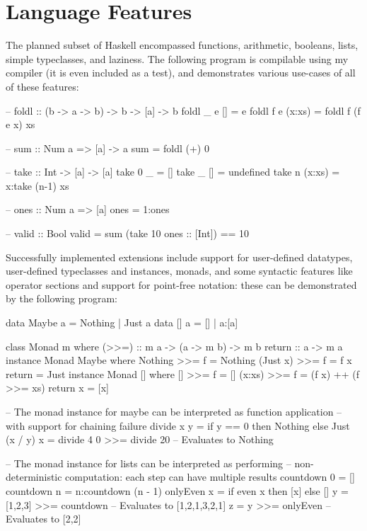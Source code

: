 \documentclass[dissertation.tex]{subfiles}
\begin{document}
\section{Language Features}
{

    The planned subset of Haskell encompassed functions, arithmetic, booleans, lists, simple typeclasses, and laziness.
    The following program is compilable using my compiler (it is even included as a test), and demonstrates various
    use-cases of all of these features:

    \begin{haskellfigure}
    -- foldl :: (b -> a -> b) -> b -> [a] -> b
    foldl _ e [] = e
    foldl f e (x:xs) = foldl f (f e x) xs

    -- sum :: Num a => [a] -> a
    sum = foldl (+) 0

    -- take :: Int -> [a] -> [a]
    take 0 _ = []
    take _ [] = undefined
    take n (x:xs) = x:take (n-1) xs

    -- ones :: Num a => [a]
    ones = 1:ones

    -- valid :: Bool
    valid = sum (take 10 ones :: [Int]) == 10
    \end{haskellfigure}

    Successfully implemented extensions include support for user-defined datatypes, user-defined typeclasses and
    instances, monads, and some syntactic features like operator sections and support for point-free notation: these can
    be demonstrated by the following program:

    \begin{haskellfigure}
    data Maybe a = Nothing | Just a
    data [] a = [] | a:[a]
    
    class Monad m where
        (>>=) :: m a -> (a -> m b) -> m b
        return :: a -> m a
    instance Monad Maybe where
        Nothing >>= f = Nothing
        (Just x) >>= f = f x
        return = Just
    instance Monad [] where
        [] >>= f = []
        (x:xs) >>= f = (f x) ++ (f >>= xs)
        return x = [x]

    -- The monad instance for maybe can be interpreted as function application
    -- with support for chaining failure
    divide x y = if y == 0 then Nothing else Just (x / y)
    x = divide 4 0 >>= divide 20 -- Evaluates to Nothing

    -- The monad instance for lists can be interpreted as performing
    -- non-deterministic computation: each step can have multiple results
    countdown 0 = []
    countdown n = n:countdown (n - 1)
    onlyEven x = if even x then [x] else []
    y = [1,2,3] >>= countdown -- Evaluates to [1,2,1,3,2,1]
    z = y >>= onlyEven -- Evaluates to [2,2]
    \end{haskellfigure}

}
\end{document}
